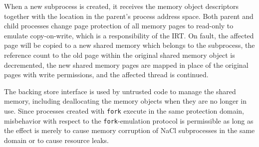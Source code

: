 When a new subprocess is created, it receives the memory object
descriptors together with the location in the parent's process address
space. Both parent and child processes change page protection of all
memory pages to read-only to emulate copy-on-write, which is a
responsibility of the IRT. On fault, the affected page will be copied
to a new shared memory which belongs to the subprocess, the reference
count to the old page within the original shared memory object is
decremented, the new shared memory pages are mapped in place of the
original pages with write permissions, and the affected thread is
continued.

The backing store interface is used by untrusted code to manage the
shared memory, including deallocating the memory objects when they are
no longer in use.  Since processes created with \lstinline`fork`
execute in the same protection domain, misbehavior with respect to the
\lstinline`fork`-emulation protocol is permissible as long as the
effect is merely to cause memory corruption of NaCl subprocesses in
the same domain or to cause resource leaks.



